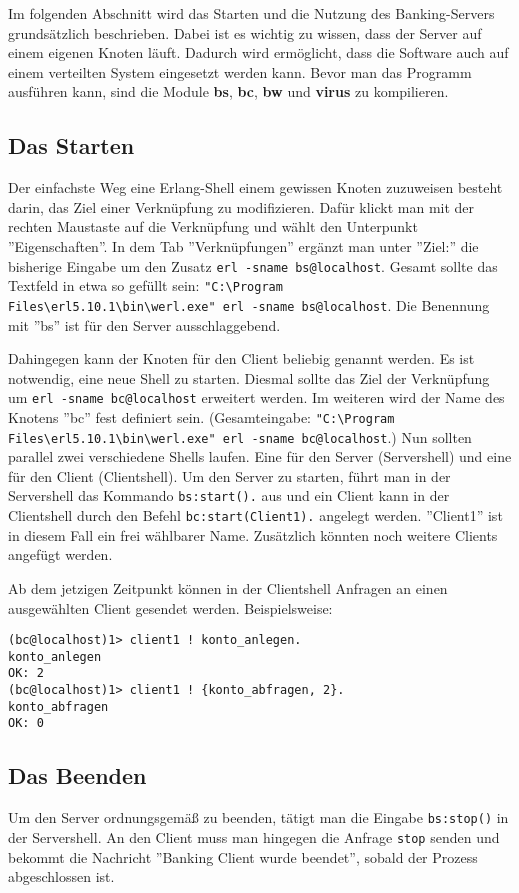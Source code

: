 Im folgenden Abschnitt wird das Starten und die Nutzung des Banking-Servers grundsätzlich beschrieben. Dabei ist es wichtig zu wissen, dass der Server auf einem eigenen Knoten läuft. Dadurch wird ermöglicht, dass die Software auch auf einem verteilten System eingesetzt werden kann. Bevor man das Programm ausführen kann, sind die Module \textbf{bs}, \textbf{bc}, \textbf{bw} und \textbf{virus} zu kompilieren.

\subsection{Das Starten}

Der einfachste Weg eine Erlang-Shell einem gewissen Knoten zuzuweisen besteht darin, das Ziel einer Verknüpfung zu modifizieren. Dafür klickt man mit der rechten Maustaste auf die Verknüpfung und wählt den Unterpunkt ''Eigenschaften''.  In dem Tab ''Verknüpfungen'' ergänzt man unter ''Ziel:'' die bisherige Eingabe um den Zusatz \texttt{erl -sname bs@localhost}. Gesamt sollte das Textfeld in etwa so gefüllt sein: \texttt{"C:\textbackslash Program Files\textbackslash erl5.10.1\textbackslash bin\textbackslash werl.exe"\ erl -sname bs@localhost}. Die Benennung mit ''bs'' ist für den Server ausschlaggebend.


Dahingegen kann der Knoten für den Client beliebig genannt werden. Es ist notwendig, eine neue Shell zu starten. Diesmal sollte das Ziel der Verknüpfung um \texttt{erl -sname bc@localhost} erweitert werden. Im weiteren wird der Name des Knotens ''bc'' fest definiert sein. (Gesamteingabe: \texttt{"C:\textbackslash Program Files\textbackslash erl5.10.1\textbackslash bin\textbackslash werl.exe"\ erl -sname bc@localhost}.) Nun sollten parallel zwei verschiedene Shells laufen. Eine für den Server (Servershell) und eine für den Client (Clientshell). Um den Server zu starten, führt man in der Servershell das Kommando \texttt{bs:start().} aus und ein Client kann in der Clientshell durch den Befehl \texttt{bc:start(Client1).} angelegt werden. ''Client1'' ist in diesem Fall ein frei wählbarer Name. Zusätzlich könnten noch weitere Clients angefügt werden.


Ab dem jetzigen Zeitpunkt können in der Clientshell Anfragen an einen ausgewählten Client gesendet werden. Beispielsweise:

\begin{lstlisting} 
(bc@localhost)1> client1 ! konto_anlegen.
konto_anlegen
OK: 2
(bc@localhost)1> client1 ! {konto_abfragen, 2}.
konto_abfragen
OK: 0
\end{lstlisting}

\subsection{Das Beenden}

Um den Server ordnungsgemäß zu beenden, tätigt man die Eingabe \texttt{bs:stop()} in der Servershell. An den Client muss man hingegen die Anfrage \texttt{stop} senden und bekommt die Nachricht ''Banking Client wurde beendet'', sobald der Prozess abgeschlossen ist.
